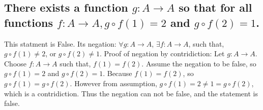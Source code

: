 \documentclass[10pt, letterpaper, titlepage]{article}
\newcommand{\0}{\varnothing}
\newcommand{\1}{\{ 1 \}}
\newcommand{\2}{\{ (1,1) \}}
\newcommand{\gof}{g \circ f}
\begin{document}
        \subsection{There exists a function $g: A \to A$ so that for all functions $f: A \to A, \gof(1) = 2$ and $\gof(2) = 1$.}
            This statment is False.
            Its negation: $\forall g: A \to A$, $\exists f: A \to A$, such that, $\gof(1) \neq 2$, or $\gof(2) \neq 1$.
            Proof of negation by contridiction:
            Let $g: A \to A$.
            Choose $f: A \to A$ such that, $f(1) = f(2)$.
            Assume the negation to be false, so $\gof(1) = 2$ and $\gof(2) = 1.$
            Because $f(1) = f(2)$, so $\gof(1) = \gof(2)$.
            However from assumption, $\gof(1) = 2 \neq 1 = \gof(2)$, which is a contridiction.
            Thus the negation can not be false, and the statement is false.
\end{document}
